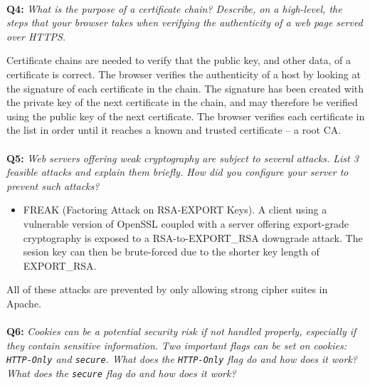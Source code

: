\paragraph{}
\textbf{Q4:}
\textit{What is the purpose of a certificate chain? Describe, on a high-level, the steps that your browser takes when verifying the authenticity of a web page served over HTTPS.}

Certificate chains are needed to verify that the public key, and other data, of a certificate is correct.
The browser verifies the authenticity of a host by looking at the signature of each certificate in the chain.
The signature has been created with the private key of the next certificate in the chain, and may therefore be verified using the public key of the next certificate.
The browser verifies each certificate in the list in order until it reaches a known and trusted certificate – a root CA.\cite{x509}

\paragraph{}
\textbf{Q5:}
\textit{Web servers offering weak cryptography are subject to several attacks. List 3 feasible attacks and explain them briefly. How did you configure your server to prevent such attacks?}

\begin{itemize}
    \item
        FREAK (Factoring Attack on RSA-EXPORT Keys)\cite{freak-ssl-tls}.
        A client using a vulnerable version of OpenSSL coupled with a server offering export-grade cryptography is exposed to a RSA-to-EXPORT\_RSA downgrade attack.
        The sesion key can then be brute-forced due to the shorter key length of EXPORT\_RSA.

\end{itemize}

All of these attacks are prevented by only allowing strong cipher suites in Apache.

\paragraph{}
\textbf{Q6:}
\cprotect\textit{Cookies can be a potential security risk if not handled properly, especially if they contain sensitive information. Two important flags can be set on cookies: \verb/HTTP-Only/ and \verb/secure/. What does the \verb/HTTP-Only/ flag do and how does it work? What does the \verb/secure/ flag do and how does it work?}

